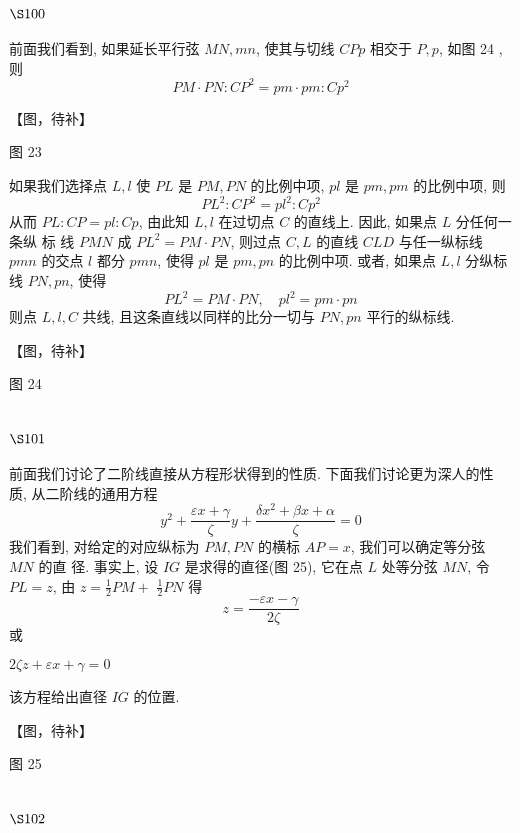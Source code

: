 \section{$\S 100$}

前面我们看到, 如果延长平行弦 $M N, m n$, 使其与切线 $C P p$ 相交于 $P, p$, 如图 24 , 则
\[
P M \cdot P N: C P^{2}=p m \cdot p m: C p^{2}
\]

【图，待补】

图 23

如果我们选择点 $L, l$ 使 $P L$ 是 $P M, P N$ 的比例中项, $p l$ 是 $p m, p m$ 的比例中项, 则
\[
P L^{2}: C P^{2}=p l^{2}: C p^{2}
\]
从而 $P L: C P=p l: C p$, 由此知 $L, l$ 在过切点 $C$ 的直线上. 因此, 如果点 $L$ 分任何一条纵 标 线 $P M N$ 成 $P L^{2}=P M \cdot P N$, 则过点 $C, L$ 的直线 $C L D$ 与任一纵标线 $p m n$ 的交点 $l$ 都分 $p m n$, 使得 $p l$ 是 $p m, p n$ 的比例中项. 或者, 如果点 $L, l$ 分纵标线 $P N, p n$, 使得
\[
P L^{2}=P M \cdot P N, \quad p l^{2}=p m \cdot p n
\]
则点 $L, l, C$ 共线, 且这条直线以同样的比分一切与 $P N, p n$ 平行的纵标线.


【图，待补】

图 24

\section{$\S 101$}

前面我们讨论了二阶线直接从方程形状得到的性质. 下面我们讨论更为深人的性 质, 从二阶线的通用方程
\[
y^{2}+\frac{\varepsilon x+\gamma}{\zeta} y+\frac{\delta x^{2}+\beta x+\alpha}{\zeta}=0
\]
我们看到, 对给定的对应纵标为 $P M, P N$ 的横标 $A P=x$, 我们可以确定等分弦 $M N$ 的直 径. 事实上, 设 $I G$ 是求得的直径(图 25), 它在点 $L$ 处等分弦 $M N$, 令 $P L=z$, 由 $z=\frac{1}{2} P M+$ $\frac{1}{2} P N$ 得
\[
z=\frac{-\varepsilon x-\gamma}{2 \zeta}
\]
或 

$2\zeta z +\varepsilon x+ \gamma=0$

该方程给出直径 $I G$ 的位置.


【图，待补】

图 25

\section{$\S 102$}


